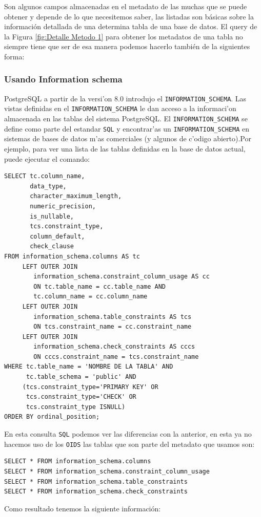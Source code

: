 Son algunos campos almacenadas en el metadato de las muchas que se puede obtener y depende de lo que necesitemos saber, las listadas son b\'asicas sobre la informaci\'on detallada de una determina tabla de una base de datos. El query de la Figura \ref{fig:Detalle Metodo 1} para obtener los metadatos de una tabla no siempre tiene que ser de esa manera podemos hacerlo tambi\'en de la siguientes forma:
\subsubsection{Usando Information schema}
PostgreSQL  a partir de la versi'on 8.0 introdujo el \texttt{INFORMATION\_SCHEMA}. Las vistas definidas en el \texttt{INFORMATION\_SCHEMA} le dan acceso a la informaci'on almacenada en las tablas del sistema PostgreSQL. El \texttt{INFORMATION\_SCHEMA} se define como parte del estandar \texttt{SQL} y encontrar'as un \texttt{INFORMATION\_SCHEMA} en sistemas de bases de datos m'as comerciales (y algunos de c'odigo abierto).Por ejemplo, para ver una lista de las tablas definidas en la base de datos actual, puede ejecutar el comando:
\lstset{language=sql,breaklines=true}
\label{SQLDetalleTablaMetodo2}
\begin{lstlisting}
SELECT tc.column_name,
       data_type,
       character_maximum_length,
       numeric_precision,
       is_nullable,
       tcs.constraint_type,
       column_default,
       check_clause
FROM information_schema.columns AS tc
     LEFT OUTER JOIN
        information_schema.constraint_column_usage AS cc
     	ON tc.table_name = cc.table_name AND
        tc.column_name = cc.column_name
     LEFT OUTER JOIN
        information_schema.table_constraints AS tcs
     	ON tcs.constraint_name = cc.constraint_name
     LEFT OUTER JOIN
        information_schema.check_constraints AS cccs
     	ON cccs.constraint_name = tcs.constraint_name
WHERE tc.table_name = 'NOMBRE DE LA TABLA' AND
      tc.table_schema = 'public' AND
     (tcs.constraint_type='PRIMARY KEY' OR 
      tcs.constraint_type='CHECK' OR 
      tcs.constraint_type ISNULL)
ORDER BY ordinal_position;
\end{lstlisting}
En esta consulta \texttt{SQL} podemos ver las diferencias con la anterior, en esta ya no hacemos uso de los \texttt{OIDS} las tablas que son parte del metadato que usamos son:

\lstset{language=sql,breaklines=true}
\begin{lstlisting}
SELECT * FROM information_schema.columns
SELECT * FROM information_schema.constraint_column_usage
SELECT * FROM information_schema.table_constraints
SELECT * FROM information_schema.check_constraints
\end{lstlisting}
Como resultado tenemos la siguiente informaci\'on:

